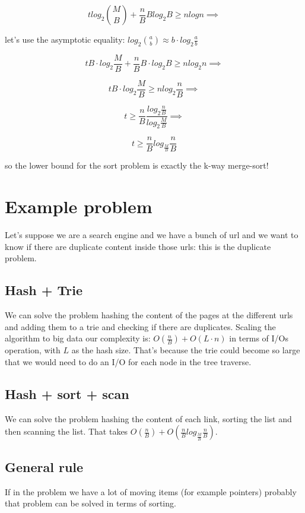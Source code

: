 $$
    t log_2 \binom{M}{B} + \frac{n}{B}Blog_2 B \geq nlogn \implies
$$

let's use the asymptotic equality: $log_2 \binom{a}{b} \approx b \cdot log_2 \frac{a}{b}$

$$
    tB\cdot log_2 \frac{M}{B} + \frac{n}{B} B \cdot log_2 B \geq n log_2 n \implies    
$$

$$
    tB \cdot log_2 \frac{M}{B} \geq n log_2 \frac{n}{B} \implies
$$

$$
    t \geq \frac{n}{B}\frac{log_2 \frac{n}{B}}{log_2 \frac{M}{B}} \implies
$$

$$
    t \geq \frac{n}{B} log_{\frac{M}{B}} \frac{n}{B}
$$

so the lower bound for the sort problem is exactly the k-way merge-sort!

\section{Example problem}
Let's suppose we are a search engine and we have a bunch of url and we want to know if there are duplicate content inside those urls: this is the duplicate problem.

\subsection{Hash + Trie}
We can solve the problem hashing the content of the pages at the different urls and adding them to a trie and checking if there are duplicates.
Scaling the algorithm to big data our complexity is: $O\left( \frac{n}{B} \right) + O\left( L \cdot n\right)$ in terms of I/Os operation, with $L$ as the hash size.
That's because the trie could become so large that we would need to do an I/O for each node in the tree traverse.

\subsection{Hash + sort + scan}
We can solve the problem hashing the content of each link, sorting the list and then scanning the list.
That takes $O\left( \frac{n}{B} \right) + O\left( \frac{n}{B} log_{\frac{M}{B}} \frac{n}{B} \right)$.

\subsection{General rule}
If in the problem we have a lot of moving items (for example pointers) probably that problem can be solved in terms of sorting.

